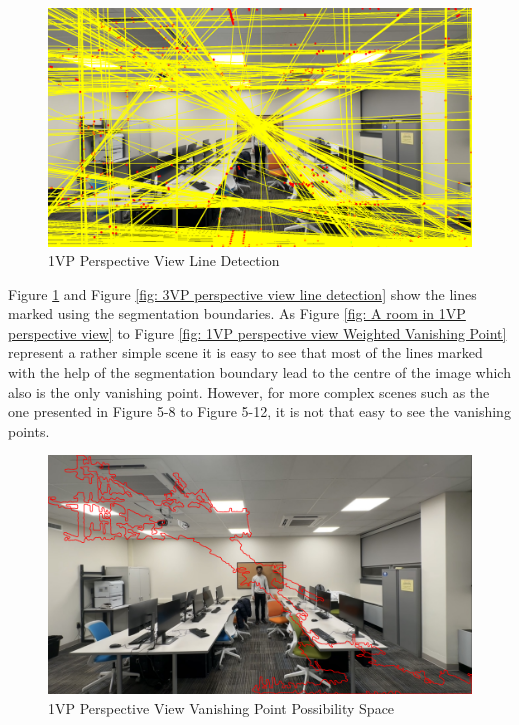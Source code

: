 \documentclass[12pt]{report}
\begin{document}
\begin{figure}[H]
    \centering
    \includegraphics[width=1.0\textwidth]{1vp Segmentation and Corner Detection Result.png}
    \caption{1VP Perspective View Line Detection}
    \label{fig: 1VP perspective view line detection}
\end{figure}

Figure \ref{fig: 1VP perspective view line detection} and Figure \ref{fig: 3VP perspective view line detection} show the lines marked using the segmentation boundaries. As Figure \ref{fig: A room in 1VP perspective view} to Figure \ref{fig: 1VP perspective view Weighted Vanishing Point} represent a rather simple scene it is easy to see that most of the lines marked with the help of the segmentation boundary lead to the centre of the image which also is the only vanishing point. However, for more complex scenes such as the one presented in Figure 5-8 to Figure 5-12, it is not that easy to see the vanishing points.\newline

\begin{figure}[H]
    \centering
    \includegraphics[width=1.0\textwidth]{1vp Most Converged Area.png}
    \caption{1VP Perspective View Vanishing Point Possibility Space}
    \label{fig: 1VP perspective view Vanishing point possibility space}
\end{figure}
\end{document}
